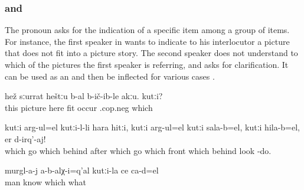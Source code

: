 
\subsubsection{ and  }
\label{sssec:kuti and ceruna which}

The pronoun  asks for the indication of a specific item among a group of items. For instance, the first speaker in  wants to indicate to his interlocutor a picture that does not fit into a picture story. The second speaker does not understand to which of the pictures the first speaker is referring, and asks for clarification. It can be used as an  and then be inflected for various cases .

\begin{exe}
	\ex	\label{ex:This picture does not fit here. Which}
	\gll	hež	sːurrat	heštːu	b-al	b-ič-ib-le	akːu. kutːi?\\
		this	picture	here	\tsc{n-}fit	occur	\tsc.{cop.neg}	which\\
	\glt	{}

	\ex	\label{ex:Which (picture) goes behind which, which goes in front, which goes behind, take a look}
	\gll	kutːi	arg-ul=el	kutːi-l-li	hara	hitːi,	kutːi	arg-ul=el kutːi	sala-b=el,	kutːi	hila-b=el,		er d-irq'-aj!\\
		which	go	which	behind	after	which	go	which	front\tsc{-n=indq}		which	behind		look -do.\\
	\glt	{}

	\ex	\label{ex:The men did not know which was whose}
	\gll	murgl-a-j	a-b-alχ-i=q'al	kutːi-la	ce	ca-d=el\\
		man	know	which	what	\\
	\glt	{}
\end{exe}

